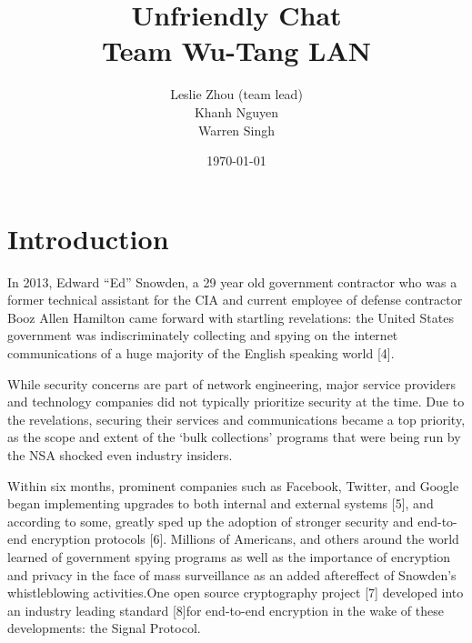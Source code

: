 \documentclass[12pt]{article}
\title{%
    Unfriendly Chat\\
    \large Team Wu-Tang LAN}
\author{Leslie Zhou (team lead)\\ Khanh Nguyen \\ Warren Singh}
\date{\today}
\begin{document}
\maketitle

\newpage
\tableofcontents
\newpage

\section{Introduction}
\par %
In 2013, Edward “Ed” Snowden, a 29 year old government contractor who was a former technical assistant for the CIA and current employee of defense contractor Booz Allen Hamilton came forward with startling revelations: the United States government was indiscriminately collecting and spying on the internet communications of a huge majority of the English speaking world [4].

While security concerns are part of network engineering, major service providers and technology companies did not typically prioritize security at the time. Due to the revelations, securing their services and communications became a top priority, as the scope and extent of the ‘bulk collections’ programs that were being run by the NSA shocked even industry insiders.

\par %
Within six months, prominent companies such as Facebook, Twitter, and Google began implementing upgrades to both internal and external systems [5], and according to some, greatly sped up the adoption of stronger security and end-to-end encryption protocols [6]. Millions of Americans, and others around the world learned of government spying programs as well as the importance of encryption and privacy in the face of mass surveillance as an added aftereffect of Snowden’s whistleblowing activities.One open source cryptography project [7] developed into an industry leading standard [8]for end-to-end encryption in the wake of these developments: the Signal Protocol.  
\end{document}
